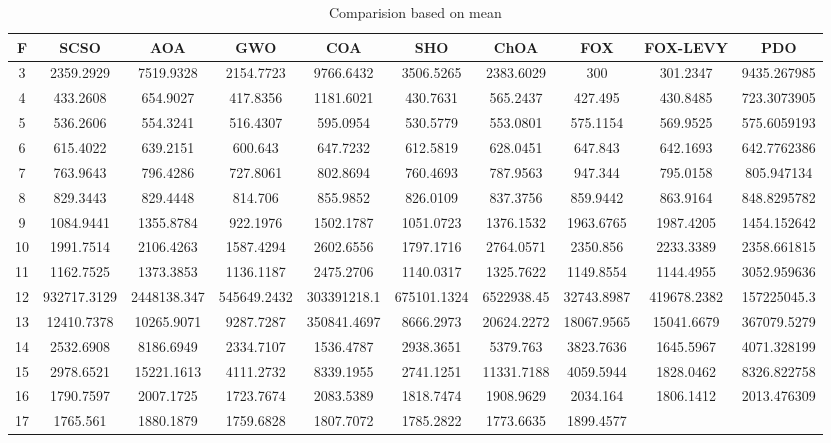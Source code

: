 \documentclass[
]{article}
\begin{document}
\begin{justify}
{\begin{table}[h]
\caption{Comparision based on mean}
\scriptsize %
\begin{tabular}{||c c c c c c c c c c||}
\hline
F & SCSO  & AOA & GWO & COA & SHO & ChOA & FOX & FOX-LEVY & PDO\\ [1ex]
\hline\hline
3 & 2359.2929 & 7519.9328 & 2154.7723 & 9766.6432 & 3506.5265 & 2383.6029 &
  300 & 301.2347 & 9435.267985 \\ 4 & 433.2608 & 654.9027 & 417.8356 &
  1181.6021 & 430.7631 & 565.2437 & 427.495 & 430.8485 & 723.3073905 \\ 5 &
  536.2606 & 554.3241 & 516.4307 & 595.0954 & 530.5779 & 553.0801 & 575.1154 &
  569.9525 & 575.6059193 \\ 6 & 615.4022 & 639.2151 & 600.643 & 647.7232 &
  612.5819 & 628.0451 & 647.843 & 642.1693 & 642.7762386 \\ 7 & 763.9643 &
  796.4286 & 727.8061 & 802.8694 & 760.4693 & 787.9563 & 947.344 & 795.0158 &
  805.947134 \\ 8 & 829.3443 & 829.4448 & 814.706 & 855.9852 & 826.0109 &
  837.3756 & 859.9442 & 863.9164 & 848.8295782 \\ 9 & 1084.9441 & 1355.8784 &
  922.1976 & 1502.1787 & 1051.0723 & 1376.1532 & 1963.6765 & 1987.4205 &
  1454.152642 \\ 10 & 1991.7514 & 2106.4263 & 1587.4294 & 2602.6556 &
  1797.1716 & 2764.0571 & 2350.856 & 2233.3389 & 2358.661815 \\ 11 & 1162.7525
  & 1373.3853 & 1136.1187 & 2475.2706 & 1140.0317 & 1325.7622 & 1149.8554 &
  1144.4955 & 3052.959636 \\ 12 & 932717.3129 & 2448138.347 & 545649.2432 &
  303391218.1 & 675101.1324 & 6522938.45 & 32743.8987 & 419678.2382 &
  157225045.3 \\ 13 & 12410.7378 & 10265.9071 & 9287.7287 & 350841.4697 &
  8666.2973 & 20624.2272 & 18067.9565 & 15041.6679 & 367079.5279 \\ 14 &
  2532.6908 & 8186.6949 & 2334.7107 & 1536.4787 & 2938.3651 & 5379.763 &
  3823.7636 & 1645.5967 & 4071.328199 \\ 15 & 2978.6521 & 15221.1613 &
  4111.2732 & 8339.1955 & 2741.1251 & 11331.7188 & 4059.5944 & 1828.0462 &
  8326.822758 \\ 16 & 1790.7597 & 2007.1725 & 1723.7674 & 2083.5389 &
  1818.7474 & 1908.9629 & 2034.164 & 1806.1412 & 2013.476309 \\ 17 & 1765.561
  & 1880.1879 & 1759.6828 & 1807.7072 & 1785.2822 & 1773.6635 & 1899.4577 &

\end{tabular}
\end{table}}
\end{justify}
\end{document}
